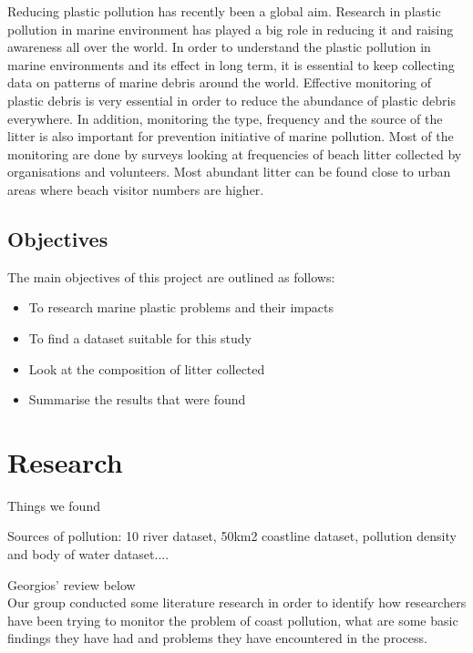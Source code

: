 \documentclass[10pt]{article}\usepackage[]{graphicx}\usepackage[]{color}
\begin{document}
Reducing plastic pollution has recently been a global aim. Research in plastic pollution in marine environment has played a big role in reducing it and raising awareness all over the world. In order to understand the plastic pollution in marine environments and its effect in long term, it is essential to keep collecting data on patterns of marine debris around the world. Effective monitoring of plastic debris is very essential in order to reduce the abundance of plastic debris everywhere. In addition, monitoring the type, frequency and the source of the litter is also important for prevention initiative of marine pollution. Most of the monitoring are done by surveys looking at frequencies of beach litter collected by organisations and volunteers.\cite{COE1997} Most abundant litter can be found close to urban areas where beach visitor numbers are higher.\cite{GARRITY1993}


\subsection{Objectives }\label{obj}

The main objectives of this project are outlined as follows:
\begin{itemize}	
\item To research marine plastic problems and their impacts
\item To find a dataset suitable for this study
\item	Look at the composition of litter collected 
\item	Summarise the results that were found
\end{itemize}


\pagebreak
\section{Research}\label{research}

Things we found

Sources of pollution: 10 river dataset, 50km2 coastline dataset, pollution density and body of water dataset....

Georgios' review below\\

Our group conducted some literature research in order to identify how researchers have been trying to monitor the problem of coast pollution, what are some basic findings they have had and problems they have encountered in the process.\\
\end{document}
